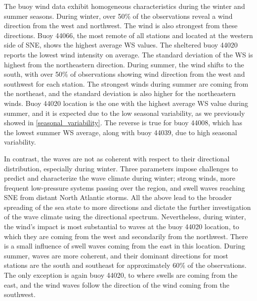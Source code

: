 The buoy wind data exhibit homogeneous characteristics during the winter and summer seasons. During winter, over 50\% of the observations reveal a wind direction from the west and northwest. The wind is also strongest from these directions. Buoy 44066, the most remote of all stations and located at the western side of SNE, shows the highest average WS values. The sheltered buoy 44020 reports the lowest wind intensity on average. The standard deviation of the WS is highest from the northeastern direction. During summer, the wind shifts to the south, with over 50\% of observations showing wind direction from the west and southwest for each station. The strongest winds during summer are coming from the northeast, and the standard deviation is also higher for the northeastern winds. Buoy 44020 location is the one with the highest average WS value during summer, and it is expected due to the low seasonal variability, as we previously showed in \ref{seasonal_variability}. The reverse is true for buoy 44008, which has the lowest summer WS average, along with buoy 44039, due to high seasonal variability.

In contrast, the waves are not as coherent with respect to their directional distribution, especially during winter. Three parameters impose challenges to predict and characterize the wave climate during winter; strong winds, more frequent low-pressure systems passing over the region, and swell waves reaching SNE from distant North Atlantic storms. All the above lead to the broader spreading of the sea state to more directions and dictate the further investigation of the wave climate using the directional spectrum. Nevertheless, during winter, the wind's impact is most substantial to waves at the buoy 44020 location, to which they are coming from the west and secondarily from the northwest. There is a small influence of swell waves coming from the east in this location. During summer, waves are more coherent, and their dominant directions for most stations are the south and southeast for approximately 60\% of the observations. The only exception is again buoy 44020, to where swells are coming from the east, and the wind waves follow the direction of the wind coming from the southwest.



